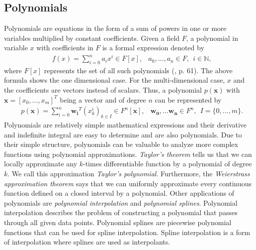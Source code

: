 \subsection{Polynomials}
Polynomials are equations in the form of a sum of powers in one or more variables multiplied by constant coefficients. Given a field $F$, a polynomial in variable $x$ with coefficients in $F$ is a formal expression denoted by
\begin{align*}
  &f(x) = \sum_{i=0}^{n} a_i x^i \in F[x], &a_0, ..., a_n \in F, \ \ i \in \mathbb{N},
\end{align*}
where $F[x]$ represents the set of all such polynomials (\cite{fischer2014}, p. 61). The above formula shows the one dimensional case. For the multi-dimensional case, $x$ and the coefficients are vectors instead of scalars. Thus, a polynomial $p(\mathbf{x})$ with $\mathbf{x} = [x_0, ..., x_m]^T$ being a vector and of degree $n$ can be represented by
\begin{align*}
  &p(\mathbf{x}) = \sum_{i=0}^{n} \mathbf{w_i}^T (x_k^i)_{k \in I} \in F^n[\mathbf{x}], &\mathbf{w_0}, ... \mathbf{w_n} \in F^n, \ \ I = \{0, ..., m\}.
\end{align*}
Polynomials are relatively simple mathematical expressions and their derivative and indefinite integral are easy to determine and are also polynomials. Due to their simple structure, polynomials can be valuable to analyze more complex functions using polynomial approximations. \textit{Taylor's theorem} tells us that we can locally approximate any $k$-times differentiable function by a polynomial of degree $k$. We call this approximation \textit{Taylor's polynomial}. Furthermore, the \textit{Weierstrass approximation theorem} says that we can uniformly approximate every continuous function defined on a closed interval by a polynomial. Other applications of polynomials are \textit{polynomial interpolation} and \textit{polynomial splines}. Polynomial interpolation describes the problem of constructing a polynomial that passes through all given data points. Polynomial splines are piecewise polynomial functions that can be used for spline interpolation. Spline interpolation is a form of interpolation where splines are used as interpolants.

